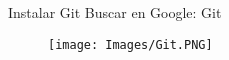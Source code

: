 \begin{frame}[t]{Instalar Git}\vspace{10pt}
Buscar en Google: Git
\begin{figure}
	\texttt{[image: Images/Git.PNG]}
\end{figure}

\end{frame}